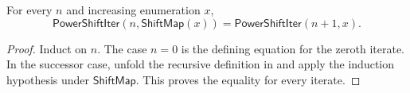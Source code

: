 \begin{lemma}
For every $n$ and increasing enumeration $x$,
\[
\mathsf{PowerShiftIter}(n,\mathsf{ShiftMap}(x))
=\mathsf{PowerShiftIter}(n+1,x).
\]
\end{lemma}
\begin{proof}
Induct on $n$.  The case $n=0$ is the defining equation for the zeroth
iterate.  In the successor case, unfold the recursive definition in
 and apply the induction hypothesis under
$\mathsf{ShiftMap}$.  This proves the equality for every iterate.
\end{proof}
